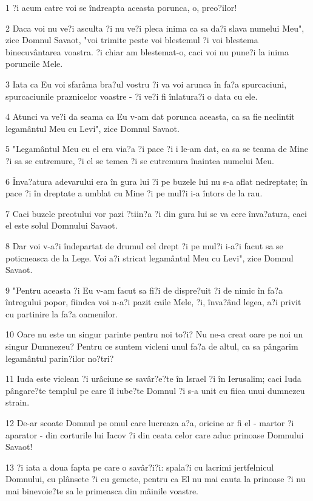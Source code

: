 \par 1 ?i acum catre voi se îndreapta aceasta porunca, o, preo?ilor!
\par 2 Daca voi nu ve?i asculta ?i nu ve?i pleca inima ca sa da?i slava numelui Meu", zice Domnul Savaot, "voi trimite peste voi blestemul ?i voi blestema binecuvântarea voastra. ?i chiar am blestemat-o, caci voi nu pune?i la inima poruncile Mele.
\par 3 Iata ca Eu voi sfarâma bra?ul vostru ?i va voi arunca în fa?a spurcaciuni, spurcaciunile praznicelor voastre - ?i ve?i fi înlatura?i o data cu ele.
\par 4 Atunci va ve?i da seama ca Eu v-am dat porunca aceasta, ca sa fie neclintit legamântul Meu cu Levi", zice Domnul Savaot.
\par 5 "Legamântul Meu cu el era via?a ?i pace ?i i le-am dat, ca sa se teama de Mine ?i sa se cutremure, ?i el se temea ?i se cutremura înaintea numelui Meu.
\par 6 Înva?atura adevarului era în gura lui ?i pe buzele lui nu s-a aflat nedreptate; în pace ?i în dreptate a umblat cu Mine ?i pe mul?i i-a întors de la rau.
\par 7 Caci buzele preotului vor pazi ?tiin?a ?i din gura lui se va cere înva?atura, caci el este solul Domnului Savaot.
\par 8 Dar voi v-a?i îndepartat de drumul cel drept ?i pe mul?i i-a?i facut sa se poticneasca de la Lege. Voi a?i stricat legamântul Meu cu Levi", zice Domnul Savaot.
\par 9 "Pentru aceasta ?i Eu v-am facut sa fi?i de dispre?uit ?i de nimic în fa?a întregului popor, fiindca voi n-a?i pazit caile Mele, ?i, înva?ând legea, a?i privit cu partinire la fa?a oamenilor.
\par 10 Oare nu este un singur parinte pentru noi to?i? Nu ne-a creat oare pe noi un singur Dumnezeu? Pentru ce suntem vicleni unul fa?a de altul, ca sa pângarim legamântul parin?ilor no?tri?
\par 11 Iuda este viclean ?i urâciune se savâr?e?te în Israel ?i în Ierusalim; caci Iuda pângare?te templul pe care îl iube?te Domnul ?i s-a unit cu fiica unui dumnezeu strain.
\par 12 De-ar scoate Domnul pe omul care lucreaza a?a, oricine ar fi el - martor ?i aparator - din corturile lui Iacov ?i din ceata celor care aduc prinoase Domnului Savaot!
\par 13 ?i iata a doua fapta pe care o savâr?i?i: spala?i cu lacrimi jertfelnicul Domnului, cu plânsete ?i cu gemete, pentru ca El nu mai cauta la prinoase ?i nu mai binevoie?te sa le primeasca din mâinile voastre.
